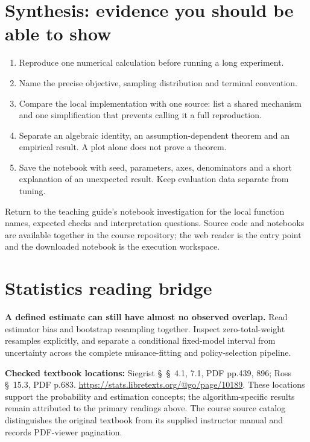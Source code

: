 \documentclass[11pt]{scrartcl}
\begin{document}
\section*{Synthesis: evidence you should be able to show}
\begin{enumerate}
\item Reproduce one numerical calculation before running a long experiment.
\item Name the precise objective, sampling distribution and terminal convention.
\item Compare the local implementation with one source: list a shared mechanism
and one simplification that prevents calling it a full reproduction.
\item Separate an algebraic identity, an assumption-dependent theorem and an
empirical result. A plot alone does not prove a theorem.
\item Save the notebook with seed, parameters, axes, denominators and a short
explanation of an unexpected result. Keep evaluation data separate from tuning.
\end{enumerate}
Return to the teaching guide's notebook investigation for the local function
names, expected checks and interpretation questions. Source code and notebooks
are available together in the course repository; the web reader is the entry
point and the downloaded notebook is the execution workspace.
\section*{Statistics reading bridge}
\textbf{A defined estimate can still have almost no observed overlap.} Read estimator bias and bootstrap resampling together. Inspect zero-total-weight resamples explicitly, and separate a conditional fixed-model interval from uncertainty across the complete nuisance-fitting and policy-selection pipeline.

\textbf{Checked textbook locations:} Siegrist \S~\S~4.1, 7.1, PDF pp.439, 896; Ross \S~15.3, PDF p.683. \url{https://stats.libretexts.org/@go/page/10189}. These locations support the probability and estimation concepts; the algorithm-specific results remain attributed to the primary readings above. The course source catalog distinguishes the original textbook from its supplied instructor manual and records PDF-viewer pagination.
\end{document}
